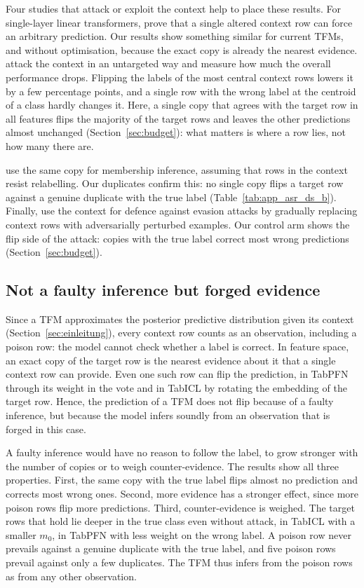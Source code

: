 \documentclass[pdflatex,sn-mathphys-num]{sn-jnl}
\begin{document}
Four studies that attack or exploit the context help to place these
results. For
single-layer linear transformers, \citet{anwar2025} prove that a single
altered context row can force an arbitrary prediction. Our results show
something similar for current TFMs, and without optimisation, because
the exact copy is already the nearest evidence. \citet{bilos2026} attack
the context in an untargeted way and measure how much the overall
performance drops. Flipping the labels of the most central context rows
lowers it by a few percentage points, and a single row with the wrong
label at the centroid of a class hardly changes it. Here, a single copy that agrees with the target row in all
features flips the majority of the target rows
and leaves the other predictions almost unchanged
(Section~\ref{sec:budget}): what matters is where a row lies, not how
many there are.

\citet{wahdany2026} use the same copy for membership inference, assuming
that rows in the context resist relabelling. Our duplicates confirm
this: no single copy flips a target row against a genuine duplicate with
the true label (Table~\ref{tab:app_asr_ds_b}). Finally,
\citet{djilani2026} use the context for
defence against evasion attacks by gradually replacing context rows with
adversarially perturbed examples. Our control arm shows the flip side of the attack:
copies with the true label correct most wrong predictions
(Section~\ref{sec:budget}).

\subsection{Not a faulty inference but forged evidence}
\label{sec:einezeile}

Since a TFM approximates the posterior predictive distribution given its
context (Section~\ref{sec:einleitung}), every context row counts as an
observation, including a poison row: the model cannot check whether a
label is correct. In feature space, an exact
copy of the target row is the nearest evidence about it that a single
context row can provide. Even one such row can flip the prediction, in TabPFN
through its weight in the vote and in TabICL by rotating the embedding of
the target row. Hence, the prediction of a TFM does not flip
because of a faulty inference, but because the model infers soundly from
an observation that is forged in this case.

A faulty inference would have no reason to follow the label, to grow
stronger with the number of copies or to weigh counter-evidence. The
results show all three properties. First, the same copy with the true
label flips almost no prediction and corrects most wrong ones. Second,
more evidence has a stronger effect, since more poison rows flip more
predictions. Third, counter-evidence is weighed. The target rows that
hold lie deeper in the true class even without attack, in TabICL with a
smaller $m_0$, in TabPFN with less weight on the wrong label. A poison row never prevails against a genuine duplicate
with the true label, and five poison rows prevail against only a few
duplicates. The TFM thus infers from the poison rows as from any other
observation.
\end{document}
